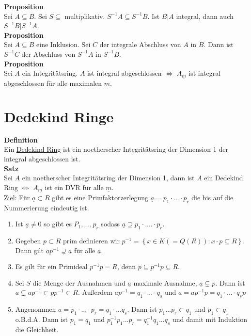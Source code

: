 \documentclass[a4paper, 12pt]{article}
\begin{document}
\textbf{Proposition}\\
Sei $A\subseteq B$. Sei $S\subseteq$ multiplikativ. $S^{-1}A \subseteq S^{-1}B$. Ist $B|A$ integral, dann auch $S^{-1}B|S^{-1}A$.\\
\textbf{Proposition}\\
Sei $A\subseteq B$ eine Inklusion. Sei $C$ der integrale Abschluss von $A$ in $B$. Dann ist $S^{-1}C$ der Abschluss von $S^{-1}A$ in $S^{-1}B$.\\
\textbf{Proposition}\\
Sei $A$ ein Integritätsring. $A$ ist integral abgeschlossen $\Leftrightarrow$ $A_{\underline{m}}$ ist integral abgeschlossen für alle maximalen $\underline{m}$.\\
\section{Dedekind Ringe}
\textbf{Definition}\\
Ein \underline{Dedekind Ring} ist ein noetherscher Integritätsring der Dimension 1 der integral abgeschlossen ist.\\
\textbf{Satz}\\
Sei $A$ ein noetherscher Integritätsring der Dimension 1, dann ist $A$ ein Dedekind Ring $\Leftrightarrow$ $A_{\underline{m}}$ ist ein DVR für alle $\underline{m}$.\\
\underline{Ziel}: Für $\underline{a} \subset R$ gibt es eine Primfaktorzerlegung $\underline{a} = p_1 \cdot ... \cdot p_r$ die bis auf die Nummerierung eindeutig ist. \begin{enumerate}
	\item Ist $\underline{a} \neq 0$ so gibt es $P_1,...,p_r$ sodass $\underline{a} \supseteq p_1\cdot .... \cdot p_r$.
	\item Gegeben $p \subset R$ prim definieren wir $p^{-1} = \left\{x \in K (= Q(R)): x\cdot p \subseteq R\right\}$. Dann gilt $\underline{a}p^{-1} \supsetneq \underline{a}$ für alle $\underline{a}$.
	\item Es gilt für ein Primideal $p^{-1}p = R$, denn $p \subseteq p^{-1}p \subseteq R$. 
	\item Sei $S$ die Menge der Ausnahmen und $\underline{a}$ maximale Ausnahme, $\underline{a} \subsetneq p$. Dann ist $\underline{a} \subsetneq ap^{-1} \subset pp^{-1} \subset R$. Außerdem $ap^{-1} = q_1\cdot ... \cdot q_s$ und $a = ap^{-1}p = q_1\cdot ... \cdot q_sp$
	\item Angenommen $\underline{a} = p_1\cdot ... \cdot p_r = q_1 \cdot ... q_s$. Dann ist $p_1...p_r \subset q_1$ und $p_1 \subset q_1$ o.B.d.A. Dann ist $p_1 = q_1$ und $p_1^{-1}p_1 ... p_r = q_1^{-1}q_1 ... q_s$ und damit mit Induktion die Gleichheit.
\end{enumerate}
\end{document}
